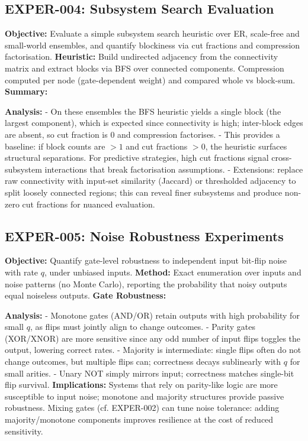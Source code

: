 \subsection{EXPER-004: Subsystem Search Evaluation}
\textbf{Objective:} Evaluate a simple subsystem search heuristic over ER, scale-free and small-world ensembles, and quantify blockiness via cut fractions and compression factorisation.
\textbf{Heuristic:} Build undirected adjacency from the connectivity matrix and extract blocks via BFS over connected components. Compression computed per node (gate-dependent weight) and compared whole vs block-sum.
\textbf{Summary:}
\begin{center}
\end{center}
\textbf{Analysis:}
- On these ensembles the BFS heuristic yields a single block (the largest component), which is expected since connectivity is high; inter-block edges are absent, so cut fraction is $0$ and compression factorises.
- This provides a baseline: if block counts are $>1$ and cut fractions $>0$, the heuristic surfaces structural separations. For predictive strategies, high cut fractions signal cross-subsystem interactions that break factorisation assumptions.
- Extensions: replace raw connectivity with input-set similarity (Jaccard) or thresholded adjacency to split loosely connected regions; this can reveal finer subsystems and produce non-zero cut fractions for nuanced evaluation.


\subsection{EXPER-005: Noise Robustness Experiments}
\textbf{Objective:} Quantify gate-level robustness to independent input bit-flip noise with rate $q$, under unbiased inputs.
\textbf{Method:} Exact enumeration over inputs and noise patterns (no Monte Carlo), reporting the probability that noisy outputs equal noiseless outputs.
\textbf{Gate Robustness:}
\begin{center}
\end{center}
\textbf{Analysis:}
- Monotone gates (AND/OR) retain outputs with high probability for small $q$, as flips must jointly align to change outcomes.
- Parity gates (XOR/XNOR) are more sensitive since any odd number of input flips toggles the output, lowering correct rates.
- Majority is intermediate: single flips often do not change outcomes, but multiple flips can; correctness decays sublinearly with $q$ for small arities.
- Unary NOT simply mirrors input; correctness matches single-bit flip survival.
\textbf{Implications:} Systems that rely on parity-like logic are more susceptible to input noise; monotone and majority structures provide passive robustness. Mixing gates (cf. EXPER-002) can tune noise tolerance: adding majority/monotone components improves resilience at the cost of reduced sensitivity.

